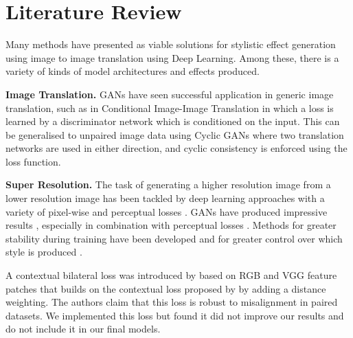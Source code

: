 \section{Literature Review}
\label{sec:literature-review}




Many methods have presented as viable solutions for stylistic effect generation using image to image translation using Deep Learning. Among these, there is a variety of kinds of model architectures and effects produced.

\vspace{5pt}\noindent\textbf{Image Translation.} GANs have seen successful application in generic image translation, such as in Conditional Image-Image Translation \cite{conditionalgan} in which a loss is learned by a discriminator network which is conditioned on the input. This can be generalised to unpaired image data using Cyclic GANs \cite{cyclicgan} where two translation networks are used in either direction, and cyclic consistency is enforced using the loss function.


\noindent\textbf{Super Resolution.} The task of generating a higher resolution image from a lower resolution image has been tackled by deep learning approaches with a variety of pixel-wise and perceptual losses \cite{image-super-resolution-with-deep-networks,accurate-image-super-resolution,resolution-perceptual-losses}. GANs have produced impressive results \cite{gan-photo-realistic-super-resolution, esrgan-super-resolution}, especially in combination with perceptual losses \cite{pulse-gan-perceptual-super-resolution,recovering-texture-super-resolution}. Methods for greater stability during training have been developed \cite{gan-progressive-stability-resolution} and for greater control over which style is produced \cite{gan-style-based-resolution}. 

\noindent A contextual bilateral loss was introduced by \cite{zoom-to-learn} based on RGB and VGG feature patches that builds on the contextual loss proposed by \cite{contextual-loss} by adding a distance weighting. The authors claim that this loss is robust to misalignment in paired datasets. We implemented this loss but found it did not improve our results and do not include it in our final models.

